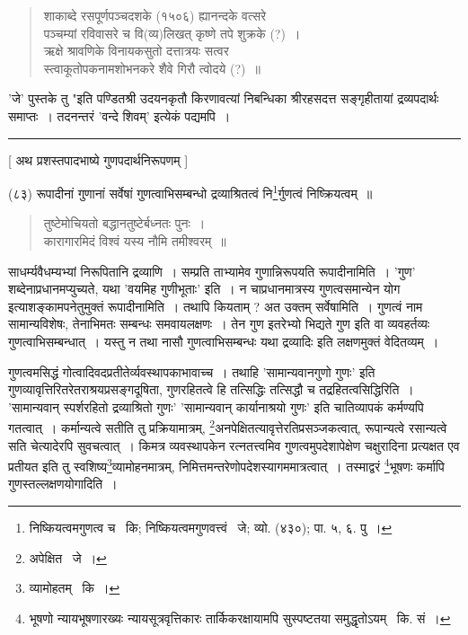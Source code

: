 \documentclass[11pt, openany]{book}
\begin{document}
{{\begin{quote}
{शाकाब्दे रसपूर्णपञ्चदशके (१५०६) ह्यानन्दके वत्सरे\\
पञ्चम्यां रविवासरे च वि(व्य)लिखत् कृष्णे तपे शुक्रके (?)~।\\ 
ऋक्षे श्रावणिके विनायकसुतो दत्तात्रयः सत्वर \textendash\ \\
स्त्वाकूतोपकनामशोभनकरे शैवे गिरौ त्वोदये (?)~॥}
\end{quote}
'जे' पुस्तके तु "इति पण्डितश्री उदयनकृतौ किरणावत्यां निबन्धिका श्रीरहसदत्त सङ्गृहीतायां द्रव्यपदार्थः समाप्तः~। तदनन्तरं 'वन्दे शिवम्' इत्येकं पद्यमपि~।
\begin{center}
\rule{0.2\linewidth}{0.5pt}
\end{center}}

\newpage
\thispagestyle{empty}
\begin{center}
{\Large [ अथ प्रशस्तपादभाष्ये गुणपदार्थनिरूपणम् ]}
\end{center}

\hangindent=2cm {\knu (८३) रूपादीनां गुणानां सर्वेषां गुणत्वाभिसम्बन्धो द्रव्याश्रितत्वं नि\renewcommand{\thefootnote}{1}\footnote{निष्कियत्वमगुणत्व च \textendash\ कि; निष्कियत्वमगुणवत्त्वं \textendash\ जे; व्यो. (४३०); पा. ५, ६. पु~।}र्गुणत्वं निष्क्रियत्वम्~॥}

\begin{quote}
{\qt तुष्टेमोचियतो बद्धानतुष्टेर्बध्नतः पुनः~।\\
कारागारमिदं विश्वं यस्य नौमि तमीश्वरम्~॥ }
\end{quote}

साधर्म्यवैधम्यभ्यां निरूपितानि द्रव्याणि~। सम्प्रति ताभ्यामेव गुणान्निरूपयति {\knu रूपादीनामि}ति~। 'गुण' शब्देनाप्रधानमप्युच्यते, यथा 'वयमिह गुणीभूताः' इति~। न चाप्रधानमात्रस्य गुणत्वसमान्येन योग इत्याशङ्कामपनेतुमुक्तं {\knu रूपादीनामि}ति~। तथापि कियताम् ? अत उक्तम् {\knu सर्वेषामि}ति~। गुणत्वं नाम सामान्यविशेषः, तेनाभिमतः सम्बन्धः समवायलक्षणः~। तेन गुण इतरेभ्यो भिद्यते गुण इति वा व्यवहर्तव्यः गुणत्वाभिसम्बन्धात्~। यस्तु न तथा नासौ गुणत्वाभिसम्बन्धः यथा द्रव्यादिः इति लक्षणमुक्तं वेदितव्यम्~।

गुणत्वमसिद्धं गोत्वादिवदप्रतीतेर्व्यवस्थापकाभावाच्च~। तथाहि 'सामान्यवानगुणो गुणः' इति गुणव्यावृत्तिरितरेतराश्रयप्रसङ्गदूषिता, गुणरहितत्वे हि तत्सिद्धिः तत्सिद्धौ च तद्रहितत्वसिद्धिरिति~। 'सामान्यवान् स्पर्शरहितो द्रव्याश्रितो गुणः' 'सामान्यवान् कार्यानाश्रयो गुणः' इति चातिव्यापकं कर्मण्यपि गतत्वात्~। कर्मान्यत्वे सतीति तु प्रक्रियामात्रम्, \renewcommand{\thefootnote}{2}\footnote{अपेक्षित \textendash\ जे~।}अनपेक्षितत्यावृत्तेरतिप्रसञ्जकत्वात्, रूपान्यत्वे रसान्यत्वे सति चेत्यादेरपि सुवचत्वात्~। किमत्र व्यवस्थापकेन रत्नतत्त्वमिव गुणत्वमुपदेशापेक्षेण चक्षुरादिना प्रत्यक्षत एव प्रतीयत इति तु स्वशिष्य\renewcommand{\thefootnote}{3}\footnote{व्यामोहतम् \textendash\ कि~।}व्यामोहनमात्रम्, निमित्तमन्तरेणोपदेशस्यागममात्रत्वात्~। तस्माद्वरं \renewcommand{\thefootnote}{4}\footnote{भूषणो न्यायभूषणारख्यः न्यायसूत्रवृत्तिकारः तार्किकरक्षायामपि सुस्पष्टतया समुद्धृतोऽयम् \textendash\ कि. सं~।}{\knu भूषणः} कर्मापि गुणस्तल्लक्षणयोगादिति~। 

}
\end{document}
